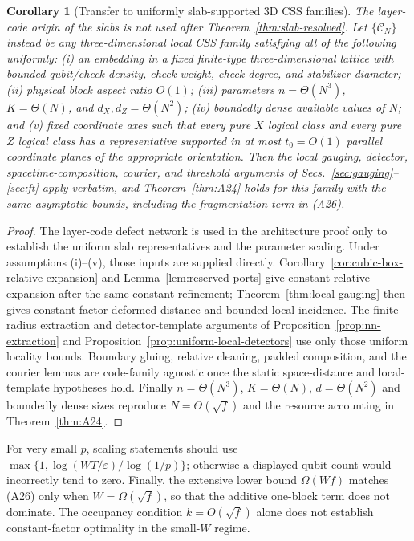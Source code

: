 \documentclass[aps,prx,reprint,superscriptaddress,nofootinbib,floatfix,longbibliography]{revtex4-2}
\newtheorem{corollary}[theorem]{Corollary}
\theoremstyle{definition}
\begin{document}
\begin{corollary}[Transfer to uniformly slab-supported 3D CSS families]
\label{cor:slab-transfer}
The layer-code origin of the slabs is not used after
Theorem~\ref{thm:slab-resolved}.  Let $\{\mathcal C_N\}$ instead be any
three-dimensional local CSS family satisfying all of the following uniformly:
(i) an embedding in a fixed finite-type three-dimensional lattice with bounded
qubit/check density, check weight, check degree, and stabilizer diameter;
(ii) physical block aspect ratio $O(1)$;
(iii) parameters $n=\Theta(N^3)$, $K=\Theta(N)$, and
$d_X,d_Z=\Theta(N^2)$; (iv) boundedly dense available values of $N$; and
(v) fixed coordinate axes such that every pure $X$ logical class and every
pure $Z$ logical class has a representative supported in at most $t_0=O(1)$
parallel coordinate planes of the appropriate orientation.  Then the local
gauging, detector, spacetime-composition, courier, and threshold arguments of
Secs.~\ref{sec:gauging}--\ref{sec:ft} apply verbatim, and Theorem~\ref{thm:A24} holds for this family
with the same asymptotic bounds, including the fragmentation term in (A26).
\end{corollary}
\begin{proof}
The layer-code defect network is used in the architecture proof only to
establish the uniform slab representatives and the parameter scaling.  Under
assumptions (i)--(v), those inputs are supplied directly.
Corollary~\ref{cor:cubic-box-relative-expansion} and
Lemma~\ref{lem:reserved-ports} give constant relative expansion
after the same constant refinement;
Theorem~\ref{thm:local-gauging} then gives constant-factor deformed
distance and bounded local incidence.  The finite-radius extraction and
detector-template arguments of Proposition~\ref{prop:nn-extraction} and
Proposition~\ref{prop:uniform-local-detectors} use only those uniform locality
bounds.  Boundary gluing, relative cleaning, padded composition, and the
courier lemmas are code-family agnostic once the static space-distance and
local-template hypotheses hold.  Finally $n=\Theta(N^3)$,
$K=\Theta(N)$, $d=\Theta(N^2)$ and boundedly dense sizes reproduce
$N=\Theta(\sqrt f)$ and the resource accounting in
Theorem~\ref{thm:A24}.
\end{proof}

For very small $p$, scaling statements should use
$\max\{1,\log(WT/\varepsilon)/\log(1/p)\}$; otherwise a displayed qubit count
would incorrectly tend to zero.  Finally, the extensive lower bound
$\Omega(Wf)$ matches (A26) only when $W=\Omega(\sqrt f)$, so that the additive
one-block term does not dominate.  The occupancy condition
$k=O(\sqrt f)$ alone does not establish constant-factor optimality in the
small-$W$ regime.
\end{document}
